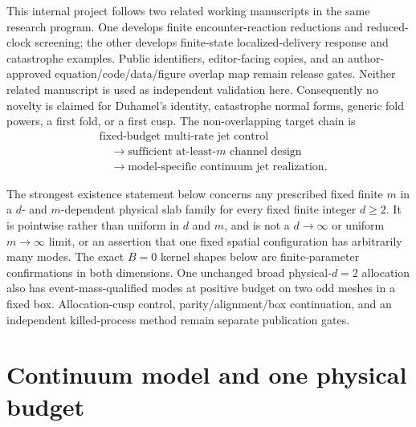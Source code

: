 \documentclass[aps,physrev,reprint,amsmath,amssymb,longbibliography,floatfix]{revtex4-2}
\begin{document}
This internal project follows two related working manuscripts in the same
research program.  One develops finite encounter-reaction reductions and
reduced-clock screening; the other develops finite-state localized-delivery
response and catastrophe examples.  Public identifiers, editor-facing copies,
and an author-approved equation/code/data/figure overlap map remain release
gates.  Neither related manuscript is used as independent validation here.
Consequently no novelty is claimed for Duhamel's identity, catastrophe normal
forms, generic fold powers, a first fold, or a first cusp.  The non-overlapping
target chain is
\begin{equation}
\begin{split}
&\text{fixed-budget multi-rate jet control}\\
&\quad\longrightarrow\text{sufficient at-least-}m\text{ channel design}\\
&\quad\longrightarrow\text{model-specific continuum jet realization}.
\end{split}
\label{eq:chain}
\end{equation}

The strongest existence statement below concerns any prescribed fixed finite
$m$ in a $d$- and $m$-dependent physical slab family for every fixed finite
integer $d\ge2$.  It is pointwise rather than uniform in $d$ and $m$, and is
not a $d\to\infty$ or uniform $m\to\infty$ limit, or an assertion
that one fixed spatial configuration has arbitrarily many modes.  The exact
$B=0$ kernel shapes below are finite-parameter confirmations in both
dimensions.  One unchanged broad physical-$d=2$ allocation also has
event-mass-qualified modes at positive budget on two odd meshes in a fixed
box.  Allocation-cusp control, parity/alignment/box continuation, and an
independent killed-process method remain separate publication gates.

\section{Continuum model and one physical budget}\label{sec:model}
\end{document}
